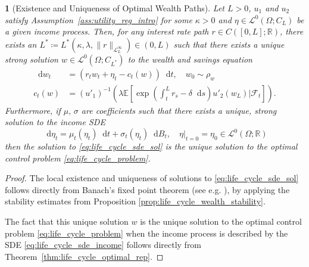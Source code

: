 \documentclass[11pt,oneside,english,reqno,dvipsnames,table]{amsart}
\numberwithin{equation}{section}
\theoremstyle{plain}
\theoremstyle{definition}
\theoremstyle{remark}
\theoremstyle{plain}
\theoremstyle{plain}
\theoremstyle{plain}
\newtheorem{cor}[thm]{\protect\corollaryname}
\theoremstyle{plain}
\theoremstyle{plain}
\theoremstyle{plain}
\theoremstyle{plain}
\providecommand{\corollaryname}{Corollary}
\newcommand{\cF}{\mathcal{F}}
\newcommand{\scL}{\mathscr{L}}
\newcommand{\EE}{\mathbb{E}}
\newcommand{\RR}{\mathbb{R}}
\newcommand{\dd}{\mathop{}\!\mathrm{d}}
\newcommand{\mbR}{\mathbb{R}}
\newcommand{\msL}{\mathscr{L}}
\newcommand{\tzero}{|_{t=0}}
\numberwithin{thm}{section}
\begin{document}
%
\begin{cor}[Existence and Uniqueness of Optimal Wealth Paths] \label{cor:life_cycle_well_posed}
 Let $L>0$, $u_1$ and $u_2$ satisfy Assumption~\ref{ass:utility_reg_intro} for some $\kappa>0$ and $\eta \in \msL^0(\Omega;C_L)$ be a given income process.
  Then, for any interest rate path $r\in C([0,L];\RR)$, there exists an $L^* \coloneqq L^*(\kappa,\lambda,\|r\|_{\msL^\infty_L})\in (0,L)$ such that there exists a unique strong solution $w \in \scL^0(\Omega;C_{L^*}) $ to the wealth and savings equation
  \begin{equation}\label{eq:life_cycle_sde_sol}
       \begin{aligned}
        \dd w_t& = (r_tw_t +\eta_t -c_t(w))\dd t,\quad w_0\sim \rho_w
        \\
        c_t(w)&= (u'_1)^{-1} \left( \lambda \EE \left[ \exp\left( \int_t^L r_s-\delta \dd s \right) u'_2(w_L) |\cF_t\right]\right).
  \end{aligned}
  \end{equation}
%
Furthermore, if $\mu,\, \sigma$ are coefficients such that there exists a unique, strong solution to the income SDE
 \begin{equation}\label{eq:life_cycle_sde_income}
     \dd \eta_t = \mu_t(\eta_t)\dd t + \sigma_t(\eta_t)\dd B_t, \quad \eta\tzero = \eta_0 \in \msL^0(\Omega;\mbR)
 \end{equation}
%
then the solution to \eqref{eq:life_cycle_sde_sol} is the unique solution to the optimal control problem \eqref{eq:life_cycle_problem}. 
\end{cor}
%
\begin{proof}
    The local existence and uniqueness of solutions to \eqref{eq:life_cycle_sde_sol} follows directly from Banach's fixed point theorem (see e.g. \cite{Ciesielski07}), by applying the stability estimates from Proposition \ref{prop:life_cycle_wealth_stability}.

    The fact that this unique solution $w$ is the unique solution to the optimal control problem \eqref{eq:life_cycle_problem} when the income process is described by the SDE \eqref{eq:life_cycle_sde_income} 
 follows directly from Theorem~\ref{thm:life_cycle_optimal_rep}.
\end{proof}
\end{document}
